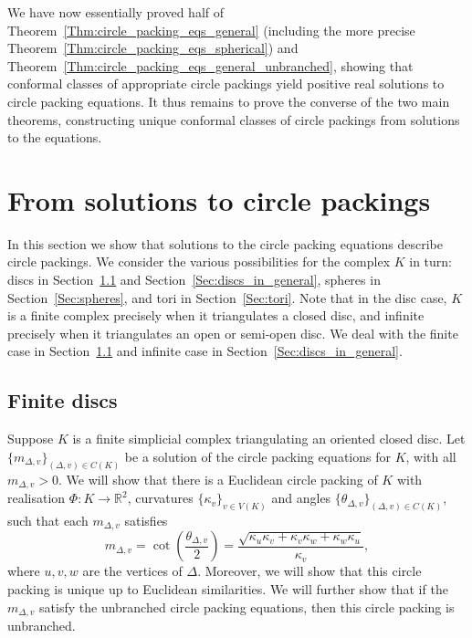 \documentclass[12pt]{amsart}
\numberwithin{equation}{section}
\theoremstyle{named}
\newcommand{\refsec}[1]{Section~\ref{Sec:#1}}
\newcommand{\refthm}[1]{Theorem~\ref{Thm:#1}}
\newcommand{\R}{\mathbb{R}}
\begin{document}
We have now essentially proved half of \refthm{circle_packing_eqs_general} (including the more precise \refthm{circle_packing_eqs_spherical}) and \refthm{circle_packing_eqs_general_unbranched}, showing that conformal classes of appropriate circle packings yield positive real solutions to circle packing equations.
It thus remains to prove the converse of the two main theorems, constructing unique conformal classes of circle packings from solutions to the equations.


\section{From solutions to circle packings}
\label{Sec:solutions_to_packings}

In this section we show that solutions to the circle packing equations describe circle packings. We consider the various possibilities for the complex $K$ in turn: discs in \refsec{closed_disc} and \refsec{discs_in_general}, spheres in \refsec{spheres}, and tori in \refsec{tori}. Note that in the disc case, $K$ is a finite complex precisely when it triangulates a closed disc, and infinite precisely when it triangulates an open or semi-open disc. We deal with the finite case in \refsec{closed_disc} and infinite case in \refsec{discs_in_general}.


\subsection{Finite discs}
\label{Sec:closed_disc}

 Suppose $K$ is a finite simplicial complex triangulating an oriented closed disc. Let $\{m_{\Delta,v}\}_{(\Delta,v) \in C(K)}$ be a solution of the circle packing equations for $K$, with all $m_{\Delta,v} > 0$. We will show that there is a Euclidean circle packing of $K$ with realisation $\Phi \colon K \to \R^2$, curvatures $\{\kappa_v\}_{v \in V(K)}$ and angles $\{\theta_{\Delta,v}\}_{(\Delta,v) \in C(K)}$, such that each $m_{\Delta,v}$ satisfies
\begin{equation}
\label{Eqn:desired_relations}
m_{\Delta,v} = \cot \left( \frac{\theta_{\Delta,v}}{2} \right)
= \frac{\sqrt{\kappa_u \kappa_v + \kappa_v \kappa_w + \kappa_w \kappa_u}}{\kappa_v},
\end{equation}
where $u,v,w$ are the vertices of $\Delta$. Moreover, we will show that this circle packing is unique up to Euclidean similarities. We will further show that if the $m_{\Delta,v}$ satisfy the unbranched circle packing equations, then this circle packing is unbranched.
\end{document}
